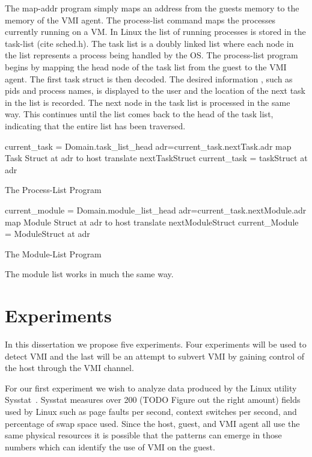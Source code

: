 The map-addr program simply maps an address from the guests memory to the memory of the VMI agent. The process-list command maps the processes currently running on a VM. In Linux the list of running processes is stored in the task-list (cite sched.h). The task list is a doubly linked list where each node in the list represents a process being handled by the OS. The process-list program begins by mapping the head node of the task list from the guest to the VMI agent. The first task struct is then decoded. The desired information , such as pids and process names, is displayed to the user and the location of the next task in the list is recorded. The next node in the task list is processed in the same way. This continues until the list comes back to the head of the task list, indicating that the entire list has been traversed. 


\begin{algorithm}[p]\label{ProcList}
	\SetAlgoLined
	current\_task = Domain.task\_list\_head\;
	{
	 	adr=current\_task.nextTask.adr \;
	 	map Task Struct at adr to host \;
	 	translate nextTaskStruct 	   \;
	 	current\_task = taskStruct at adr \;
	}
	\caption{The Process-List Program}
\end{algorithm}


\begin{algorithm}[p]\label{ModList}
	\SetAlgoLined
	current\_module = Domain.module\_list\_head\;
	{
	 	adr=current\_task.nextModule.adr \;
	 	map Module Struct at adr to host \;
	 	translate nextModuleStruct 	   \;
	 	current\_Module = ModuleStruct at adr \;
	}
	\caption{The Module-List Program}
\end{algorithm}



The module list works in much the same way. 


\section{Experiments}
In this dissertation we propose five experiments. Four experiments will be used to detect VMI and the last will be an attempt to subvert VMI by gaining control of the host through the VMI channel. 

For our first experiment we wish to analyze data produced by the Linux utility Sysstat~\cite{godard_sysstat_2010}. Sysstat measures over 200 (TODO Figure out the right amount) fields used by Linux such as page faults per second, context switches per second, and percentage of swap space used. Since the host, guest, and VMI agent all use the same physical resources it is possible that the patterns can emerge in those numbers which can identify the use of VMI on the guest. 

